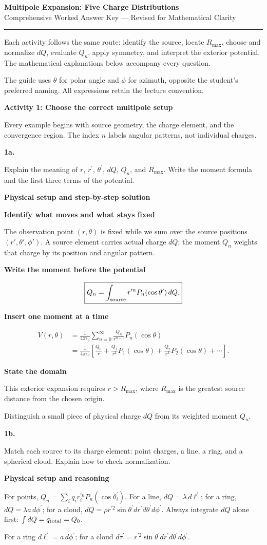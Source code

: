 \documentclass[11pt]{article}
\newcommand{\heading}[2]{\begin{center}{\LARGE\bfseries\color{navy} #1}\\[5pt]{\large #2}\end{center}\vspace{2pt}\hrule\vspace{9pt}}
\newcommand{\topic}[1]{\par{\Large\bfseries\color{navy}#1}\par}
\newcommand{\q}[2]{\par\bigskip\noindent\textbf{\color{navy}#1}\par\smallskip #2\par\medskip}
\newcommand{\concept}[2]{\begin{tcolorbox}[colback=blue!7,colframe=blue,title=#1,fonttitle=\bfseries,boxrule=.6pt,breakable]#2\end{tcolorbox}}
\newcommand{\bridge}[1]{\begin{tcolorbox}[colback=white,colframe=amber,title=Physical starting point,fonttitle=\bfseries,boxrule=.5pt,breakable]#1\end{tcolorbox}}
\newcommand{\stage}[1]{\par\medskip\noindent\textbf{\color{blue}#1}\par\smallskip}
\newcommand{\connect}[1]{\begin{tcolorbox}[colback=blue!4,colframe=blue!45,title=Keep the thread,fonttitle=\bfseries,boxrule=.45pt,breakable]#1\end{tcolorbox}}
\begin{document}
\heading{Multipole Expansion: Five Charge Distributions}{Comprehensive Worked Answer Key — Revised for Mathematical Clarity}
\concept{Problem-solving thread}{Each activity follows the same route: identify the source, locate $R_{\max}$, choose and normalize $dQ$, evaluate $Q_n$, apply symmetry, and interpret the exterior potential. The mathematical explanations below accompany every question.}
\concept{Convention}{The guide uses $\theta$ for polar angle and $\phi$ for azimuth, opposite the student's preferred naming. All expressions retain the lecture convention.}
\topic{Activity 1: Choose the correct multipole setup}
\bridge{Every example begins with source geometry, the charge element, and the convergence region. The index $n$ labels angular patterns, not individual charges.}

\q{1a.}{Explain the meaning of $r$, $r^\prime$, $\theta^\prime$, $dQ$, $Q_n$, and $R_{\max}$. Write the moment formula and the first three terms of the potential.}
\stage{Physical setup and step-by-step solution}

\stage{Identify what moves and what stays fixed}
The observation point $(r,\theta)$ is fixed while we sum over the source positions $(r',\theta',\phi')$. A source element carries actual charge $dQ$; the moment $Q_n$ weights that charge by its position and angular pattern.
\stage{Write the moment before the potential}
\[\boxed{Q_n=\int_{\rm source}r'^nP_n(\cos\theta')\,dQ.}\]
\stage{Insert one moment at a time}
\begin{align*}V(r,\theta)&=\frac1{4\pi\epsilon_0}\sum_{n=0}^\infty\frac{Q_n}{r^{n+1}}P_n(\cos\theta)\\&=\frac1{4\pi\epsilon_0}\left[\frac{Q_0}{r}+\frac{Q_1}{r^2}P_1(\cos\theta)+\frac{Q_2}{r^3}P_2(\cos\theta)+\cdots\right].\end{align*}
\stage{State the domain}
This exterior expansion requires $r>R_{\max}$, where $R_{\max}$ is the greatest source distance from the chosen origin.
\connect{Distinguish a small piece of physical charge $dQ$ from its weighted moment $Q_n$.}

\q{1b.}{Match each source to its charge element: point charges, a line, a ring, and a spherical cloud. Explain how to check normalization.}
\stage{Physical setup and reasoning}

For points, $Q_n=\sum_i q_i r_i^{\prime n}P_n(\cos\theta_i^\prime)$. For a line, $dQ=\lambda\,d\ell^\prime$; for a ring, $dQ=\lambda a\,d\phi^\prime$; for a cloud, $dQ=\rho r^{\prime2}\sin\theta^\prime dr^\prime d\theta^\prime d\phi^\prime$. Always integrate $dQ$ alone first: $\int dQ=q_{\rm total}=Q_0$.
\connect{For a ring $d\ell^\prime=a\,d\phi^\prime$; for a cloud $d\tau^\prime=r^{\prime2}\sin\theta^\prime dr^\prime d\theta^\prime d\phi^\prime$.}
\end{document}

